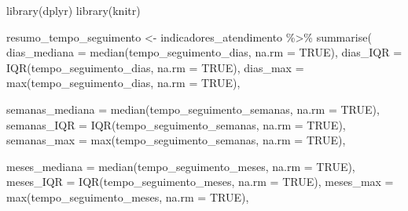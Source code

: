 \documentclass[
]{article}
\newenvironment{Shaded}{\begin{snugshade}}{\end{snugshade}}
\newcommand{\AttributeTok}[1]{\textcolor[rgb]{0.40,0.45,0.13}{#1}}
\newcommand{\ConstantTok}[1]{\textcolor[rgb]{0.56,0.35,0.01}{#1}}
\newcommand{\FunctionTok}[1]{\textcolor[rgb]{0.28,0.35,0.67}{#1}}
\newcommand{\NormalTok}[1]{\textcolor[rgb]{0.00,0.23,0.31}{#1}}
\newcommand{\OtherTok}[1]{\textcolor[rgb]{0.00,0.23,0.31}{#1}}
\newcommand{\SpecialCharTok}[1]{\textcolor[rgb]{0.37,0.37,0.37}{#1}}
\begin{document}
\begin{Shaded}
\begin{Highlighting}[]
\FunctionTok{library}\NormalTok{(dplyr)}
\FunctionTok{library}\NormalTok{(knitr)}

\NormalTok{resumo\_tempo\_seguimento }\OtherTok{\textless{}{-}}\NormalTok{ indicadores\_atendimento }\SpecialCharTok{\%\textgreater{}\%}
  \FunctionTok{summarise}\NormalTok{(}
    \AttributeTok{dias\_mediana    =} \FunctionTok{median}\NormalTok{(tempo\_seguimento\_dias, }\AttributeTok{na.rm =} \ConstantTok{TRUE}\NormalTok{),}
    \AttributeTok{dias\_IQR        =} \FunctionTok{IQR}\NormalTok{(tempo\_seguimento\_dias, }\AttributeTok{na.rm =} \ConstantTok{TRUE}\NormalTok{),}
    \AttributeTok{dias\_max        =} \FunctionTok{max}\NormalTok{(tempo\_seguimento\_dias, }\AttributeTok{na.rm =} \ConstantTok{TRUE}\NormalTok{),}
    
    \AttributeTok{semanas\_mediana =} \FunctionTok{median}\NormalTok{(tempo\_seguimento\_semanas, }\AttributeTok{na.rm =} \ConstantTok{TRUE}\NormalTok{),}
    \AttributeTok{semanas\_IQR     =} \FunctionTok{IQR}\NormalTok{(tempo\_seguimento\_semanas, }\AttributeTok{na.rm =} \ConstantTok{TRUE}\NormalTok{),}
    \AttributeTok{semanas\_max     =} \FunctionTok{max}\NormalTok{(tempo\_seguimento\_semanas, }\AttributeTok{na.rm =} \ConstantTok{TRUE}\NormalTok{),}
    
    \AttributeTok{meses\_mediana   =} \FunctionTok{median}\NormalTok{(tempo\_seguimento\_meses, }\AttributeTok{na.rm =} \ConstantTok{TRUE}\NormalTok{),}
    \AttributeTok{meses\_IQR       =} \FunctionTok{IQR}\NormalTok{(tempo\_seguimento\_meses, }\AttributeTok{na.rm =} \ConstantTok{TRUE}\NormalTok{),}
    \AttributeTok{meses\_max       =} \FunctionTok{max}\NormalTok{(tempo\_seguimento\_meses, }\AttributeTok{na.rm =} \ConstantTok{TRUE}\NormalTok{),}
    

\end{Highlighting}
\end{Shaded}
\end{document}
